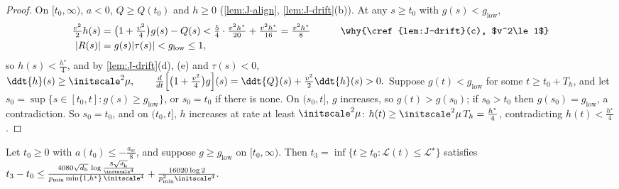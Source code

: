 \begin{proof}
On $[t_0,\infty)$, $a<0$, $Q\ge Q(t_0)$ and $h\ge0$ (\cref{lem:J-align}, \cref{lem:J-drift}(b)). At any $s\ge t_0$ with $g(s)<g_{\mathrm{low}}$,
\begin{alignat*}{2}
 \tfrac{v^2}{2}h(s)&=\bigl(1+\tfrac{v^2}{4}\bigr)g(s)-Q(s)<\tfrac{5}{4}\cdot\tfrac{v^2h^\star}{20}+\tfrac{v^2h^\star}{16}=\tfrac{v^2h^\star}{8} &\qquad& \why{\cref{lem:J-drift}(c), $v^2\le1$}\\
 |R(s)|&=g(s)|\tau(s)|<g_{\mathrm{low}}\le1,
\end{alignat*}
so $h(s)<\frac{h^\star}{4}$, and by \cref{lem:J-drift}(d), (e) and $\tau(s)<0$,
 $\ddt{h}(s)\ge\initscale^2\mu,\qquad \frac{d}{dt}\Bigl[\bigl(1+\tfrac{v^2}{4}\bigr)g\Bigr](s)=\ddt{Q}(s)+\tfrac{v^2}{2}\ddt{h}(s)>0 .$ 
Suppose $g(t)<g_{\mathrm{low}}$ for some $t\ge t_0+T_h$, and let $s_0=\sup\{s\in[t_0,t]:g(s)\ge g_{\mathrm{low}}\}$, or $s_0=t_0$ if there is none. On $(s_0,t]$, $g$
increases, so $g(t)>g(s_0)$; if $s_0>t_0$ then $g(s_0)=g_{\mathrm{low}}$, a contradiction. So $s_0=t_0$, and on $(t_0,t]$, $h$ increases at rate at least
$\initscale^2\mu$: $h(t)\ge\initscale^2\mu\,T_h=\frac{h^\star}{4}$, contradicting $h(t)<\frac{h^\star}{4}$.
\end{proof}

\begin{lemma}
\label{lem:J-grow}
Let $t_0\ge0$ with $a(t_0)\le-\frac{a_{\mathrm{sc}}}{8}$, and suppose $g\ge g_{\mathrm{low}}$ on $[t_0,\infty)$. Then $t_3=\inf\{t\ge t_0:\mathcal L(t)\le\mathcal L^\star\}$ satisfies
 $t_3-t_0\le\frac{4080\sqrt{d_{\mathrm h}}\,\log\frac{8\sqrt{d_{\mathrm h}}}{\initscale^4}}{p_{\min}\min\{1,h^\star\}\,\initscale^4}+\frac{16020\log 2}{p_{\min}^2\initscale^4} .$ 
\end{lemma}

